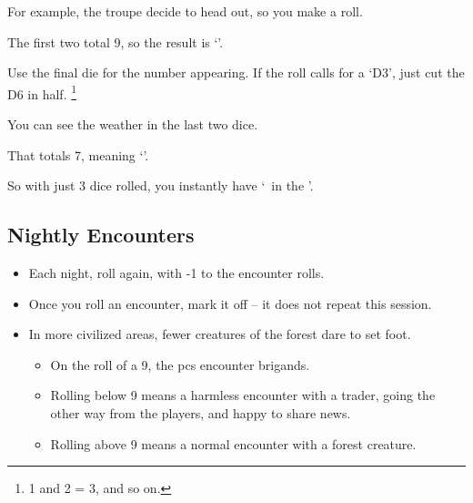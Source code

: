\begin{multicols}{2}
\begin{exampletext}
  For example, the troupe decide to head out, so you make a roll.

  \begin{center}
    {\Large{}  }
  \end{center}

  The first two total 9,
  so the result is
  \setcounter{enc}{9}
  `\bigBeastList'.

  Use the final die for the number appearing.
  If the roll calls for a `D3', just cut the D6 in half.%
  \footnote{1 and 2 = 3, and so on.}

  You can see the weather in the last two dice.

  \begin{center}
    {\Large{} }
  \end{center}

  That totals 7, meaning `\bigWeatherList'.

  So with just 3 dice rolled, you instantly have `\bigBeastList~in the \bigWeatherList'.

\end{exampletext}

\subsection{Nightly Encounters}

\begin{itemize}
  \item
  Each night, roll again, with -1 to the encounter rolls.
  \item
  Once you roll an encounter, mark it off -- it does not repeat this session.
\end{itemize}

\begin{itemize}
  \item
  In more civilized areas, fewer creatures of the forest dare to set foot.
  \begin{itemize}
    \item
    On the roll of a 9, the \glspl{pc} encounter brigands.
    \item
    Rolling below 9 means a harmless encounter with a trader, going the other way from the players, and happy to share news.
    \item
    Rolling above 9 means a normal encounter with a forest creature.
  \end{itemize}
\end{itemize}


\end{multicols}
